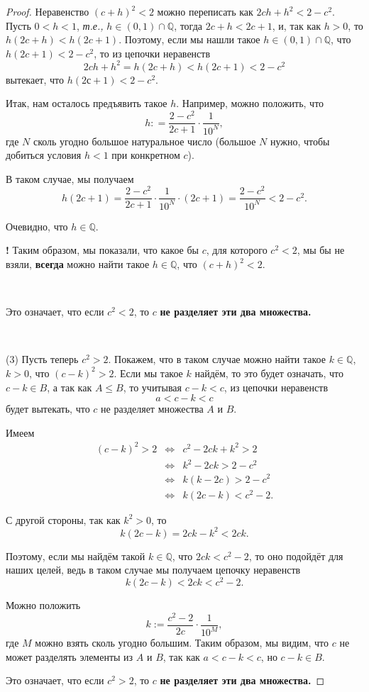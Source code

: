 \begin{proof}
Неравенство $(c+h)^2<2$ можно переписать как $2ch + h^2 < 2- c^2$. Пусть $0<h<1$, \textit{т.е.,} $h \in (0,1) \cap \mathbb{Q}$, тогда $2c+h < 2c+1$, и, так как $h >0$, то $h(2c+h)<h(2c+1)$. Поэтому, если мы нашли такое $h \in (0,1) \cap \mathbb{Q}$, что $h(2c+1) < 2-c^2$, то из цепочки неравенств
\[
 2ch +h^2 = h(2c+h) < h(2c+1) < 2-c^2
\]
вытекает, что $h(2с+1) < 2-c^2.$

Итак, нам осталось предъявить такое $h$. Например, можно положить, что
\[
 h : = \frac{2-c^2}{2c+1}\cdot \frac{1}{10^N},
\]
где $N$ сколь угодно большое натуральное число (большое $N$ нужно, чтобы добиться условия $h<1$ при конкретном $c$).

В таком случае, мы получаем
\[
 h(2c+1) = \frac{2-c^2}{2c+1}\cdot \frac{1}{10^N} \cdot (2c+1) = \frac{2-c^2}{10^N} < 2-c^2.
\]

Очевидно, что $h \in \mathbb{Q}.$

\begin{mydanger}{\bf !}
    Таким образом, мы показали, что какое бы $c$, для которого $c^2<2$, мы бы не взяли, \textbf{всегда} можно найти такое $h\in \mathbb{Q}$, что $(c+h)^2<2$.
\end{mydanger}~

\centerline{
{\color{red}Это означает, что если $c^2<2$, то $c$ \textbf{не разделяет эти два множества.}}}~

(3) Пусть теперь $c^2>2$. Покажем, что в таком случае можно найти такое $k\in \mathbb{Q}$, $k>0$, что $(c-k)^2 >2$. Если мы такое $k$ найдём, то это будет означать, что $c-k \in B$, а так как $A\le B$, то учитывая $c-k < c$, из цепочки неравенств
\[
 a< c-k < c
\]
будет вытекать, что $c$ не разделяет множества $A$ и $B.$

Имеем
\begin{eqnarray*}
    (c-k)^2 >2 &\Longleftrightarrow& c^2 - 2ck + k^2 >2 \\
     &\Longleftrightarrow& k^2 - 2ck >2-c^2 \\
     &\Longleftrightarrow& k(k-2c) > 2 -c^2 \\
     &\Longleftrightarrow& k(2c - k) < c^2 - 2.
\end{eqnarray*}

С другой стороны, так как $k^2 >0$, то
\[
 k(2c-k) = 2ck - k^2 < 2ck.
\]

Поэтому, если мы найдём такой $k\in \mathbb{Q}$, что $2ck < c^2 - 2$, то оно подойдёт для наших целей, ведь в таком случае мы получаем цепочку неравенств
\[
 k(2c-k)<2ck < c^2-2.
\]

Можно положить
\[
 k := \frac{c^2-2}{2c}\cdot \frac{1}{10^M},
\]
где $M$ можно взять сколь угодно большим. Таким образом, мы видим, что $c$ не может разделять элементы из $A$ и $B$, так как $a<c-k<c$, но $c-k \in B$.\\

\centerline{
{\color{red}Это означает, что если $c^2>2$, то $c$ \textbf{не разделяет эти два множества.}}}
\end{proof}


